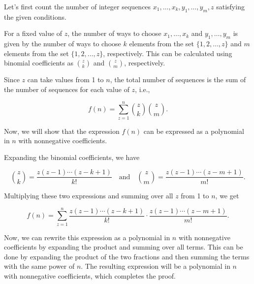 Let's first count the number of integer sequences \( x_1,\dots,x_k,y_1,\dots,y_m,z \) satisfying the given conditions.

For a fixed value of \( z \), the number of ways to choose \( x_1,\dots,x_k \) and \( y_1,\dots,y_m \) is given by the number of ways to choose \( k \) elements from the set \( \{1,2,\dots,z\} \) and \( m \) elements from the set \( \{1,2,\dots,z\} \), respectively. This can be calculated using binomial coefficients as \( \binom{z}{k} \) and \( \binom{z}{m} \), respectively.

Since \( z \) can take values from 1 to \( n \), the total number of sequences is the sum of the number of sequences for each value of \( z \), i.e.,

\[
f(n) = \sum_{z=1}^{n} \binom{z}{k} \binom{z}{m}.
\]

Now, we will show that the expression \( f(n) \) can be expressed as a polynomial in \( n \) with nonnegative coefficients.

Expanding the binomial coefficients, we have

\[
\binom{z}{k} = \frac{z(z-1)\cdots(z-k+1)}{k!} \quad \text{and} \quad \binom{z}{m} = \frac{z(z-1)\cdots(z-m+1)}{m!}.
\]

Multiplying these two expressions and summing over all \( z \) from 1 to \( n \), we get

\[
f(n) = \sum_{z=1}^{n} \frac{z(z-1)\cdots(z-k+1)}{k!} \cdot \frac{z(z-1)\cdots(z-m+1)}{m!}.
\]

Now, we can rewrite this expression as a polynomial in \( n \) with nonnegative coefficients by expanding the product and summing over all terms. This can be done by expanding the product of the two fractions and then summing the terms with the same power of \( n \). The resulting expression will be a polynomial in \( n \) with nonnegative coefficients, which completes the proof.
